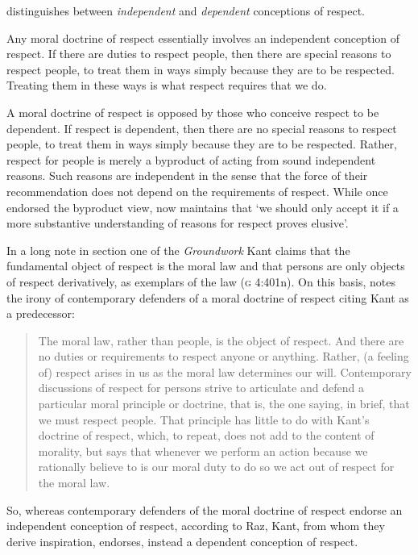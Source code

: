 \documentclass[a4paper,12pt]{article}
\begin{document}
\citet{Raz:2001ps,Raz:2002vn} distinguishes between \emph{independent} and \emph{dependent} conceptions of respect. 

Any moral doctrine of respect essentially involves an independent conception of respect. If there are duties to respect people, then there are special reasons to respect people, to treat them in ways simply because they are to be respected. Treating them in these ways is what respect requires that we do. 

A moral doctrine of respect is opposed by those who conceive respect to be dependent. If respect is dependent, then there are no special reasons to respect people, to treat them in ways simply because they are to be respected. Rather, respect for people is merely a byproduct of acting from sound independent reasons. Such reasons are independent in the sense that the force of their recommendation does not depend on the requirements of respect. While \citet{Raz:1986lq} once endorsed the byproduct view, \citet[127]{Raz:2001ps} now maintains that `we should only accept it if a more substantive understanding of reasons for respect proves elusive'. 

In a long note in section one of the \emph{Groundwork} Kant claims that the fundamental object of respect is the moral law and that persons are only objects of respect derivatively, as exemplars of the law (\textsc{g} 4:401n). On this basis, \citet[131]{Raz:2001ps} notes the irony of contemporary defenders of a moral doctrine of respect citing Kant as a predecessor:
\begin{quote}
	The moral law, rather than people, is the object of respect. And there are no duties or requirements to respect anyone or anything. Rather, (a feeling of) respect arises in us as the moral law determines our will. Contemporary discussions of respect for persons strive to articulate and defend a particular moral principle or doctrine, that is, the one saying, in brief, that we must respect people. That principle has little to do with Kant's doctrine of respect, which, to repeat, does not add to the content of morality, but says that whenever we perform an action because we rationally believe to is our moral duty to do so we act out of respect for the moral law. \citep[134]{Raz:2001ps}
\end{quote}
So, whereas contemporary defenders of the moral doctrine of respect endorse an independent conception of respect, according to Raz, Kant, from whom they derive inspiration, endorses, instead a dependent conception of respect.
\end{document}
